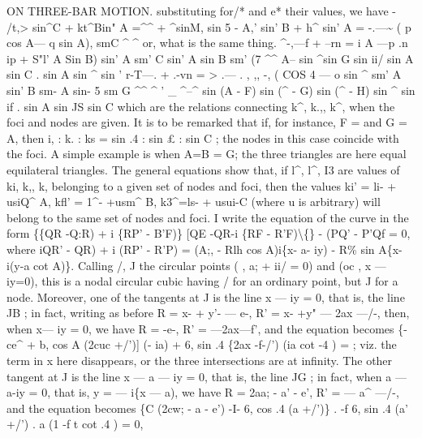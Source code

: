 \documentclass[12pt,a4paper]{article}
\begin{document}
ON THREE-BAR MOTION.
substituting for/* and
e* their values, we have
- /t,> sin\textasciicircum{}C + kt\textasciicircum{}Bin" A =\textasciicircum{}\textasciicircum{} + \textasciicircum{}sinM,
sin 5
- A,' sin' B + h\textasciicircum{} sin' A =
-.---\textasciitilde{} ( p cos A--- q sin A),
smC \textasciicircum{}
\textasciicircum{}
or, what
is the same thing.
\textasciicircum{}-,---f +
--rn =
i
A
\textbullet{}---p
\textbullet{} .n ip + S"l' A Sin B)
sin' A
sm' C
sin' A sin B sm' (7 \textasciicircum{}\textasciicircum{}
A-- sin \textasciicircum{}sin G sin ii/
sin A sin C
. sin A sin \textasciicircum{} sin
'
r-T---. +
.-vn =
>
.---
.
, ,,
-, (\guillemotright{} COS 4 --- o sin \textasciicircum{}
sm' A
sin' B
sm- A sin- 5 sm G \textasciicircum{}\textasciicircum{}
\textasciicircum{}
'
\_
\textasciicircum{}--\textasciicircum{} sin (A - F) sin (\textasciicircum{} - G) sin (\textasciicircum{} - H)
sin \textasciicircum{} sin if
. sin A sin JS sin C
which are the
relations connecting
k\textasciicircum{},
k.,,
k\textasciicircum{}, when the
foci and nodes are given.
It
is
to
be
remarked
that
if,
for
instance, F =
and
G = A,
then
i,
:
k.
:
ks
= sin .4
:
sin \pounds{}
:
sin C
; the nodes
in
this
case
coincide with the
foci.
A simple example
is when A=B = G; the three triangles are here equal
equilateral
triangles.
The general
equations show
that,
if
l\textasciicircum{},
l\textasciicircum{},
I3
are
values
of
ki,
k,,
k,
belonging
to
a
given
set
of
nodes and
foci, then the values
ki' = li- + usiQ\textasciicircum{} A,
kfl' = 1\textasciicircum{}- +usm\textasciicircum{} B, k3\textasciicircum{}=ls- + usui-C (where
u
is
arbitrary)
will belong to the same
set of nodes and
foci.
I
write the equation of the curve
in
the form
\{\{QR -Q:R) + i \{RP' - B'F)\} [QE -QR-i \{RF - R'F)\textbackslash\{\} - (PQ' - P'Qf = 0,
where
iQR' - QR) + i (RP' - R'P) = (A;, - Rlh cos A)i\{x- a- iy) - R\% sin A\{x-i(y-a cot A)\}.
Calling
/, J
the
circular
points (\guillemotleft{}
,
a; + ii/ = 0)
and
(oc
, x --- iy=0),
this
is
a
nodal
circular
cubic
having /
for
an
ordinary point,
but J
for a node.
Moreover, one
of the
tangents at J
is the
line x --- iy = 0,
that
is,
the
line JB
;
in
fact,
writing
as
before
R = x- + y'- --- e-,
R' = x- +y" --- 2ax ---/-,
then, when x--- iy = 0, we have R = -e-, R' = ---2ax---f', and the equation becomes
\{-ce\textasciicircum{} + b, cos A (2cuc +/')] (- ia) + 6, sin .4 \{2ax -f-/') (ia cot -4 ) =
;
viz.
the
term
in x
here
disappears,
or
the
three
intersections
are
at
infinity.
The
other
tangent
at J
is
the
line
x --- a --- iy = 0,
that
is,
the
line JG ;
in
fact,
when
a --- a-iy = 0,
that
is, y = --- i\{x --- a), we
have R = 2aa; - a' - e',
R' = --- a\textasciicircum{} ---/-,
and
the
equation becomes
\{C (2cw; - a\guillemotleft{} - e') -I- 6, cos .4 (a\guillemotright{} +/')\}
.
-f 6, sin .4 (a' +/') . a (1 -f t cot .4 ) = 0,
\end{document}
